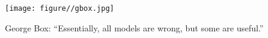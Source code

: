 \documentclass[10pt,a4paper]{beamer}
\begin{document}
%

\begin{frame}{}


\begin{figure}
  \centering
  \texttt{[image: figure//gbox.jpg]}\\
  \caption{George Box: ``Essentially, all models are wrong, but some
are useful.'' }\label{}
\end{figure}

\end{frame}
\end{document}

